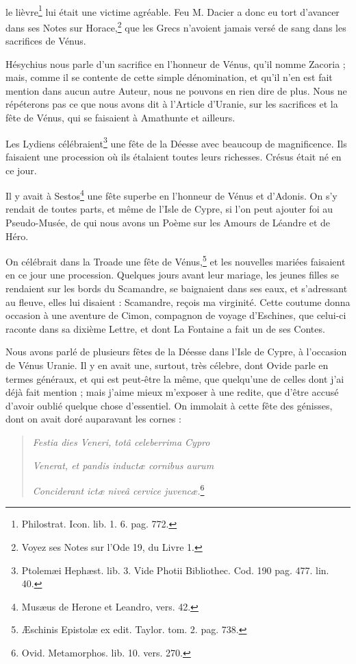 \documentclass[a4paper, 18pt, oneside]{article}
\begin{document}
\paragraph{}
le lièvre\footnote{Philostrat. Icon. lib. 1. 6. pag. 772.} lui était une victime agréable. Feu M. Dacier a donc eu tort d'avancer dans ses Notes sur Horace,\footnote{Voyez ses Notes sur l'Ode 19, du Livre 1.} que les Grecs n'avoient jamais versé de sang dans les sacrifices de Vénus.

Hésychius nous parle d'un sacrifice en l'honneur de Vénus, qu'il nomme Zacoria ; mais, comme il se contente de cette simple dénomination, et qu'il n'en est fait mention dans aucun autre Auteur, nous ne pouvons en rien dire de plus. Nous ne répéterons pas ce que nous avons dit à l'Article d'Uranie, sur les sacrifices et la fête de Vénus, qui se faisaient à Amathunte et ailleurs.

Les Lydiens célébraient\footnote{Ptolemæi Hephæst. lib. 3. Vide Photii Bibliothec. Cod. 190 pag. 477. lin. 40.} une fête de la Déesse avec beaucoup de magnificence. Ils faisaient une procession où ils étalaient toutes leurs richesses. Crésus était né en ce jour.

Il y avait à Sestos\footnote{Musæus de Herone et Leandro, vers. 42.} une fête superbe en l'honneur de Vénus et d'Adonis. On s'y rendait de toutes parts, et même de l'Isle de Cypre, si l'on peut ajouter foi au Pseudo-Musée, de qui nous avons un Poème sur les Amours de Léandre et de Héro.

On célébrait dans la Troade une fête de Vénus,\footnote{Æschinis Epistolæ ex edit. Taylor. tom. 2. pag. 738.} et les nouvelles mariées faisaient en ce jour une procession. Quelques jours avant leur mariage, les jeunes filles se rendaient sur les bords du Scamandre, se baignaient dans ses eaux, et s'adressant au fleuve, elles lui disaient : Scamandre, reçois ma virginité. Cette coutume donna occasion à une aventure de Cimon, compagnon de voyage d'Eschines, que celui-ci raconte dans sa dixième Lettre, et dont La Fontaine a fait un de ses Contes.

Nous avons parlé de plusieurs fêtes de la Déesse dans l'Isle de Cypre, à l'occasion de Vénus Uranie. Il y en avait une, surtout, très célebre, dont Ovide parle en termes généraux, et qui est peut-être la même, que quelqu'une de celles dont j'ai déjà fait mention ; mais j'aime mieux m'exposer à une redite, que d'être accusé d'avoir oublié quelque chose d'essentiel. On immolait à cette fête des génisses, dont on avait doré auparavant les cornes :
\begin{quotation}
\emph{Festia dies Veneri, totâ celeberrima Cypro}

\emph{Venerat, et pandis inductæ cornibus aurum}

\emph{Conciderant ictæ niveâ cervice juvencæ.}\footnote{Ovid. Metamorphos. lib. 10. vers. 270.}
\end{quotation}
\end{document}
